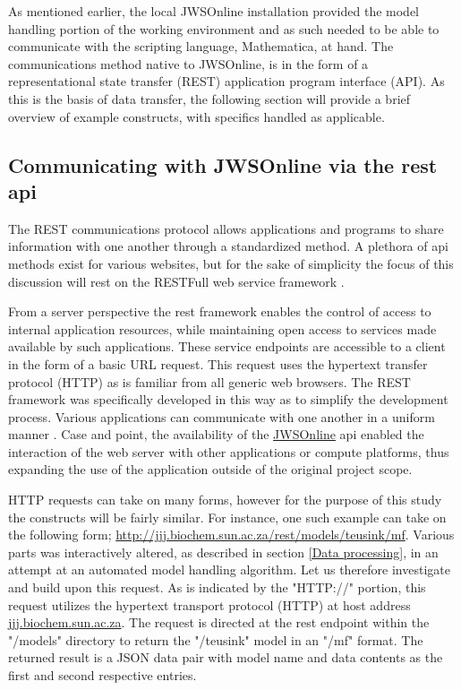 As mentioned earlier, the local JWSOnline installation provided the model handling portion of the working environment and as such needed to be able to communicate with the scripting language, Mathematica, at hand. The communications method native to JWSOnline, is in the form of a representational state transfer (REST) application program interface (API). As this is the basis of data transfer, the following section will provide a brief overview of example constructs, with specifics handled as applicable. 

\subsection{Communicating with JWSOnline via the \gls{rest} \gls{api}} \label{REST Communication}

The REST communications protocol allows applications and programs to share information with one another through a standardized method. A plethora of \gls{api} methods exist for various websites, but for the sake of simplicity the focus of this discussion will rest on the RESTFull web service framework \cite{rest2018}.

From a server perspective the \gls{rest} framework enables the control of access to internal application resources, while maintaining open access to services made available by such applications. These service endpoints are accessible to a client in the form of a basic URL request. This request uses the hypertext transfer protocol (HTTP) as is familiar from all generic web browsers. The REST framework was specifically developed in this way as to simplify the development process. Various applications can communicate with one another in a uniform manner \cite{rest2018}. Case and point, the availability of the \href{http://jjj.biochem.sun.ac.za}{JWSOnline} \gls{api} enabled the interaction of the web server with other applications or compute platforms, thus expanding the use of the application outside of the original project scope. 

HTTP requests can take on many forms, however for the purpose of this study the constructs will be fairly similar. For instance, one such example can take on the following form; \href{http://jjj.biochem.sun.ac.za/rest/models/teusink/mf}{http://jjj.biochem.sun.ac.za/rest/models/teusink/mf}. Various parts was interactively altered, as described in section \ref{Data processing}, in an attempt at an automated model handling algorithm. Let us therefore investigate and build upon this request. As is indicated by the "HTTP://" portion, this request utilizes the hypertext transport protocol (HTTP) at host address \href{jjj.biochem.sun.ac.za}{jjj.biochem.sun.ac.za}. The request is directed at the \gls{rest} endpoint within the "/models" directory to return the "/teusink" model in an "/mf" format. The returned result is a JSON data pair with model name and data contents as the first and second respective entries.

